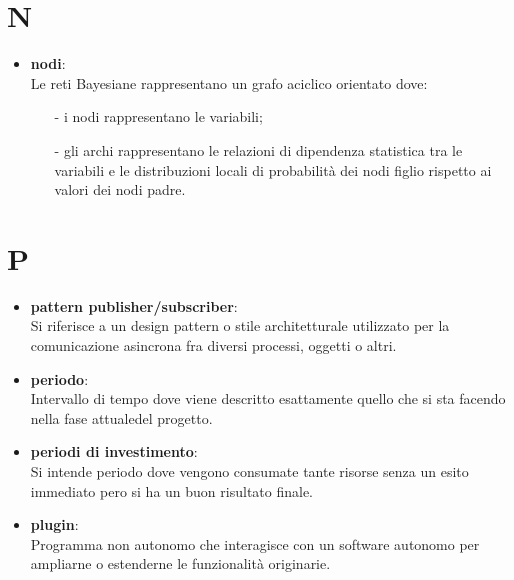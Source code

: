 \documentclass[a4paper, oneside, openany, dvipsnames, table]{article}
\begin{document}
\newpage
\section{N}
\begin{itemize}
\item \textbf{nodi}:\\	Le reti Bayesiane rappresentano un grafo aciclico orientato dove:
\begin{itemize}
\item[-] i nodi rappresentano le variabili;
\item[-] gli archi rappresentano le relazioni di dipendenza statistica tra le variabili e le distribuzioni locali di probabilità dei nodi figlio rispetto ai valori dei nodi padre.
\end{itemize}
\end{itemize}

\newpage
\section{P}

\begin{itemize}
\item \textbf{pattern publisher/subscriber}:\\	 Si riferisce a un design pattern o stile architetturale utilizzato per la comunicazione asincrona fra diversi processi, oggetti o altri.
\end{itemize}

\begin{itemize}
\item \textbf{periodo}:\\	Intervallo di tempo dove viene descritto esattamente quello che si sta facendo nella fase attualedel progetto.
\end{itemize}

\begin{itemize}
\item \textbf{periodi di investimento}:\\	Si intende periodo dove vengono consumate tante risorse senza un esito immediato pero si ha un buon risultato finale.

\end{itemize}

\begin{itemize}
\item \textbf{plugin}:\\	Programma non autonomo che interagisce con un software autonomo per ampliarne o estenderne le funzionalità originarie.
\end{itemize}
\end{document}
